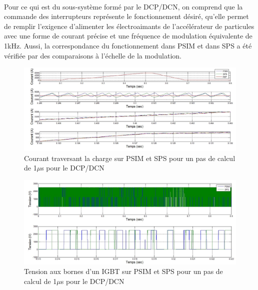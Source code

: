 \paragraph{}Pour ce qui est du sous-système formé par le DCP/DCN, on comprend que la commande des interrupteurs représente le fonctionnement désiré, qu'elle permet de remplir l'exigence d'alimenter les électroaimants de l'accélérateur de particules avec une forme de courant précise et une fréquence de modulation équivalente de 1kHz. Aussi, la correspondance du fonctionnement dans PSIM et dans SPS a été vérifiée par des comparaisons à l'échelle de la modulation. 

\begin{figure}[htb]
\centering
\includegraphics[scale=0.5]{fig/DCPDCN/DCPCourantCharge1u.jpg}
\caption{Courant traversant la charge sur PSIM et SPS pour un pas de calcul de 1$\mu$s pour le DCP/DCN}
\label{DC_ch_cou_1}
\end{figure}

\begin{figure}[htb]
\centering
\includegraphics[scale=0.5]{fig/DCPDCN/DCPTensionIGBT1u.jpg}
\caption{Tension aux bornes d'un IGBT sur PSIM et SPS pour un pas de calcul de 1$\mu$s pour le DCP/DCN}
\label{DC_IG_ten_1}
\end{figure}

\clearpage
